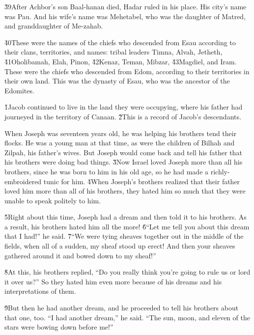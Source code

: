 \v{39}After Achbor's son Baal-hanan died, Hadar ruled in his place. His city's name was Pau. And his wife's name was Mehetabel, who was the daughter of Matred, and granddaughter of Me-zahab.

\v{40}These were the names of the chiefs who descended from Esau according to their clans, territories, and names: tribal leaders Timna, Alvah, Jetheth, \v{41}Oholibamah, Elah, Pinon, \v{42}Kenaz, Teman, Mibzar, \v{43}Magdiel, and Iram. These were the chiefs who descended from Edom, according to their territories in their own land. This was the dynasty of Esau, who was the ancestor of the Edomites.

\v{1}Jacob continued to live in the land they were occupying, where his father had journeyed in the territory of Canaan. \v{2}This is a record of Jacob's descendants.

When Joseph was seventeen years old, he was helping his brothers tend their flocks. He was a young man at that time, as were the children of Bilhah and Zilpah, his father's wives. But Joseph would come back and tell his father that his brothers were doing bad things. \v{3}Now Israel loved Joseph more than all his brothers, since he was born to him in his old age, so he had made a richly-embroidered tunic for him. \v{4}When Joseph's brothers realized that their father loved him more than all of his brothers, they hated him so much that they were unable to speak politely to him.

\v{5}Right about this time, Joseph had a dream and then told it to his brothers. As a result, his brothers hated him all the more! \v{6}``Let me tell you about this dream that I had!'' he said. \v{7}``We were tying sheaves together out in the middle of the fields, when all of a sudden, my sheaf stood up erect! And then your sheaves gathered around it and bowed down to my sheaf!''

\v{8}At this, his brothers replied, ``Do you really think you're going to rule us or lord it over us?'' So they hated him even more because of his dreams and his interpretations of them.

\v{9}But then he had another dream, and he proceeded to tell his brothers about that one, too. ``I had another dream,'' he said. ``The sun, moon, and eleven of the stars were bowing down before me!''

